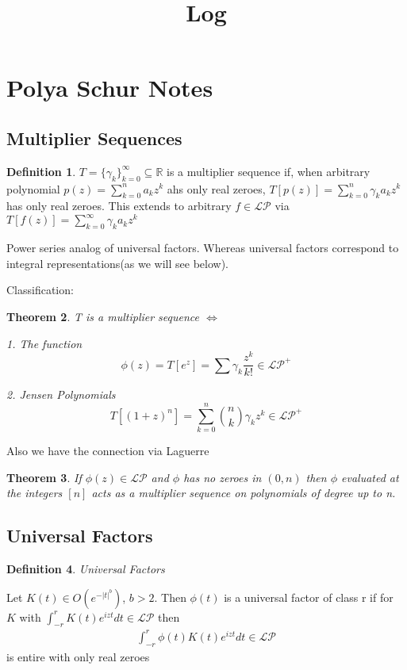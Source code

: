 \documentclass[10pt]{article}
\title{\vspace{-3em}Log}
\newcommand{\1}{\textbf{1}}
\newcommand{\R}{\mathbb{R}}
\newcommand{\pP}{\mathcal{P}}
\newcommand{\lL}{\mathcal{L}}
\newtheorem{theorem}{Theorem}
\theoremstyle{remark}
\theoremstyle{definition}
\newtheorem{definition}[theorem]{Definition}
\theoremstyle{prop}
\theoremstyle{Corollary}
\begin{document}
\section{Polya Schur Notes}

\subsection{Multiplier Sequences}

\begin{definition}
	$T = \{\gamma_k\}_{k=0}^{\infty} \subseteq \R$ is a multiplier sequence if, when arbitrary polynomial $p(z) = \sum_{k=0}^n a_k z^k$ ahs only real zeroes, $T[p(z)] = \sum_{k=0}^n \gamma_k a_kz^k$ has only real zeroes. This extends to arbitrary $f \in \lL \pP$ via $T[f(z)] = \sum_{k=0}^{\infty} \gamma_k a_k z^k$
\end{definition}

Power series analog of universal factors. Whereas universal factors correspond to integral representations(as we will see below).

Classification:

\begin{theorem}
	T is a multiplier sequence $\iff$

	1. The function
	\[
		\phi(z) = T[e^z] = \sum \gamma_k \frac{z^k}{k!} \in \lL \pP^+
	\]

	2. Jensen Polynomials 
	\[
		T[(1+z)^n] = \sum_{k=0}^n {n \choose k} \gamma_k z^k \in \lL \pP^+
	\]
\end{theorem}

Also we have the connection via Laguerre

\begin{theorem}
	If $\phi(z) \in \lL\pP$ and $\phi$ has no zeroes in $(0,n)$ then $\phi$ evaluated at the integers $[n]$ acts as a multiplier sequence on polynomials of degree up to n. 
\end{theorem}


\subsection{Universal Factors}


\begin{definition}\textit{Universal Factors}
	
	Let $K(t) \in O(e^{-|t|^b})$, $b > 2$. Then $\phi(t)$ is a universal factor of class r if for $K$ with $\int_{-r}^r K(t) e^{izt}dt \in \lL \pP$ then
	\begin{align*}
		\int_{-r}^r \phi(t)K(t)e^{izt}dt \in \lL \pP
	\end{align*}
	is entire with only real zeroes
\end{definition}
\end{document}
